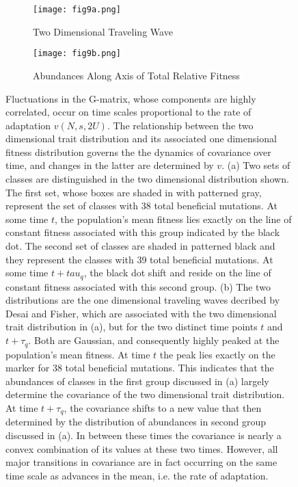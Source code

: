 \documentclass[11pt,twocolumn]{article}
\begin{document}
\begin{figure}
\begin{subfigure}[b]{1\linewidth}
\label{a}
\caption{Two Dimensional Traveling Wave}
\texttt{[image: fig9a.png]}\\
\end{subfigure}

\begin{subfigure}[b]{1\linewidth}
\label{b}
\caption{Abundances Along Axis of Total Relative Fitness}
\texttt{[image: fig9b.png]}
\end{subfigure}

\label{Fig 5}
\caption{\footnotesize Fluctuations in the G-matrix, whose components are highly correlated, occur on time scales proportional to the rate of adaptation $v(N,s,2U)$. The relationship between the two dimensional trait distribution and its associated one dimensional fitness distribution governs the the dynamics of covariance over time, and changes in the latter are determined by $v$. (a) Two sets of classes are distinguished in the two dimensional distribution shown.  The first set, whose boxes are shaded in with patterned gray, represent the set of classes with 38 total beneficial mutations.  At some time $t$, the population's mean fitness lies exactly on the line of constant fitness associated with this group indicated by the black dot. The second set of classes are shaded in patterned black and they represent the classes with 39 total beneficial mutations.  At some time $t+tau_q$, the black dot shift and reside on the line of constant fitness associated with this second group. (b) The two distributions are the one dimensional traveling waves decribed by Desai and Fisher, which are associated with the two dimensional trait distribution in (a), but for the two distinct time points $t$ and $t+\tau_q$. Both are Gaussian, and consequently highly peaked at the population's mean fitness. At time $t$ the peak lies exactly on the marker for 38 total beneficial mutations.  This indicates that the abundances of classes in the first group discussed in (a) largely determine the covariance of the two dimensional trait distribution.  At time $t+\tau_q$, the covariance shifts to a new value that then determined by the distribution of abundances in second group discussed in (a). In between these times the covariance is nearly a convex combination of its values at these two times. However, all major transitions in covariance are in fact occurring on the same time scale as advances in the mean, i.e. the rate of adaptation.}
\end{figure}
\end{document}
